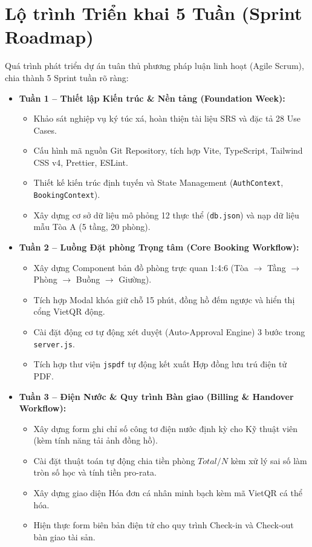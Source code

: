 \section{Lộ trình Triển khai 5 Tuần (Sprint Roadmap)}
Quá trình phát triển dự án tuân thủ phương pháp luận linh hoạt (Agile Scrum), chia thành 5 Sprint tuần rõ ràng:
\begin{itemize}
    \item \textbf{Tuần 1 -- Thiết lập Kiến trúc \& Nền tảng (Foundation Week):}
    \begin{itemize}
        \item Khảo sát nghiệp vụ ký túc xá, hoàn thiện tài liệu SRS và đặc tả 28 Use Cases.
        \item Cấu hình mã nguồn Git Repository, tích hợp Vite, TypeScript, Tailwind CSS v4, Prettier, ESLint.
        \item Thiết kế kiến trúc định tuyến và State Management (\texttt{AuthContext}, \texttt{BookingContext}).
        \item Xây dựng cơ sở dữ liệu mô phỏng 12 thực thể (\texttt{db.json}) và nạp dữ liệu mẫu Tòa A (5 tầng, 20 phòng).
    \end{itemize}

    \item \textbf{Tuần 2 -- Luồng Đặt phòng Trọng tâm (Core Booking Workflow):}
    \begin{itemize}
        \item Xây dựng Component bản đồ phòng trực quan 1:4:6 (Tòa $\rightarrow$ Tầng $\rightarrow$ Phòng $\rightarrow$ Buồng $\rightarrow$ Giường).
        \item Tích hợp Modal khóa giữ chỗ 15 phút, đồng hồ đếm ngược và hiển thị cổng VietQR động.
        \item Cài đặt động cơ tự động xét duyệt (Auto-Approval Engine) 3 bước trong \texttt{server.js}.
        \item Tích hợp thư viện \texttt{jspdf} tự động kết xuất Hợp đồng lưu trú điện tử PDF.
    \end{itemize}

    \item \textbf{Tuần 3 -- Điện Nước \& Quy trình Bàn giao (Billing \& Handover Workflow):}
    \begin{itemize}
        \item Xây dựng form ghi chỉ số công tơ điện nước định kỳ cho Kỹ thuật viên (kèm tính năng tải ảnh đồng hồ).
        \item Cài đặt thuật toán tự động chia tiền phòng $Total / N$ kèm xử lý sai số làm tròn số học và tính tiền pro-rata.
        \item Xây dựng giao diện Hóa đơn cá nhân minh bạch kèm mã VietQR cá thể hóa.
        \item Hiện thực form biên bản điện tử cho quy trình Check-in và Check-out bàn giao tài sản.
    \end{itemize}


\end{itemize}
